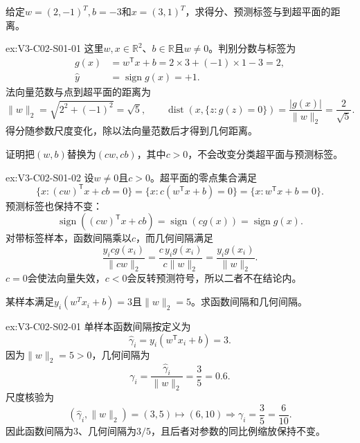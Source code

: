 \begin{SLChapterExercisePairSection}

\begin{exercise}\label{ex:V3-C02-S01-01}
给定$w=(2,-1)^T,b=-3$和$x=(3,1)^T$，求得分、预测标签与到超平面的距离。
\end{exercise}
\ifSLFullEdition
{}\label{sol:V3-C02-S01-01}
\begin{chapterexercisesolution}{ex:V3-C02-S01-01}
这里$w,x\in\mathbb R^2$、$b\in\mathbb R$且$w\neq0$。判别分数与标签为
\[
\begin{aligned}
g(x)&=w^{\mathsf T}x+b
=2\times3+(-1)\times1-3=2,\\
\widehat y&=\operatorname{sign}g(x)=+1.
\end{aligned}
\]
法向量范数与点到超平面的距离为
\[
\lVert w\rVert_2=\sqrt{2^2+(-1)^2}=\sqrt5,
\qquad
\operatorname{dist}(x,\{z:g(z)=0\})
=\frac{|g(x)|}{\lVert w\rVert_2}=\frac2{\sqrt5}.
\]
得分随参数尺度变化，除以法向量范数后才得到几何距离。
\end{chapterexercisesolution}
\fi

\begin{exercise}\label{ex:V3-C02-S01-02}
证明把$(w,b)$替换为$(cw,cb)$，其中$c>0$，不会改变分类超平面与预测标签。
\end{exercise}
\ifSLFullEdition
{}\label{sol:V3-C02-S01-02}
\begin{chapterexercisesolution}{ex:V3-C02-S01-02}
设$w\neq0$且$c>0$。超平面的零点集合满足
\[
\{x:(cw)^{\mathsf T}x+cb=0\}
=\{x:c(w^{\mathsf T}x+b)=0\}
=\{x:w^{\mathsf T}x+b=0\}.
\]
预测标签也保持不变：
\[
\operatorname{sign}\!\left((cw)^{\mathsf T}x+cb\right)
=\operatorname{sign}\!\left(cg(x)\right)
=\operatorname{sign}g(x).
\]
对带标签样本，函数间隔乘以$c$，而几何间隔满足
\[
\frac{y_i c g(x_i)}{\lVert cw\rVert_2}
=\frac{c\,y_i g(x_i)}{c\lVert w\rVert_2}
=\frac{y_i g(x_i)}{\lVert w\rVert_2}.
\]
$c=0$会使法向量失效，$c<0$会反转预测符号，所以二者不在结论内。
\end{chapterexercisesolution}
\fi

\begin{exercise}\label{ex:V3-C02-S02-01}
某样本满足$y_i(w^Tx_i+b)=3$且$\lVert w\rVert_2=5$。求函数间隔和几何间隔。
\end{exercise}
\ifSLFullEdition
{}\label{sol:V3-C02-S02-01}
\begin{chapterexercisesolution}{ex:V3-C02-S02-01}
单样本函数间隔按定义为
\[
\widehat\gamma_i=y_i(w^{\mathsf T}x_i+b)=3.
\]
因为$\lVert w\rVert_2=5>0$，几何间隔为
\[
\gamma_i=\frac{\widehat\gamma_i}{\lVert w\rVert_2}
=\frac35=0.6.
\]
尺度核验为
\[
(\widehat\gamma_i,\lVert w\rVert_2)=(3,5)
\mapsto(6,10)
\Longrightarrow \gamma_i=\frac35=\frac6{10}.
\]
因此函数间隔为$3$、几何间隔为$3/5$，且后者对参数的同比例缩放保持不变。
\end{chapterexercisesolution}
\fi


\end{SLChapterExercisePairSection}

